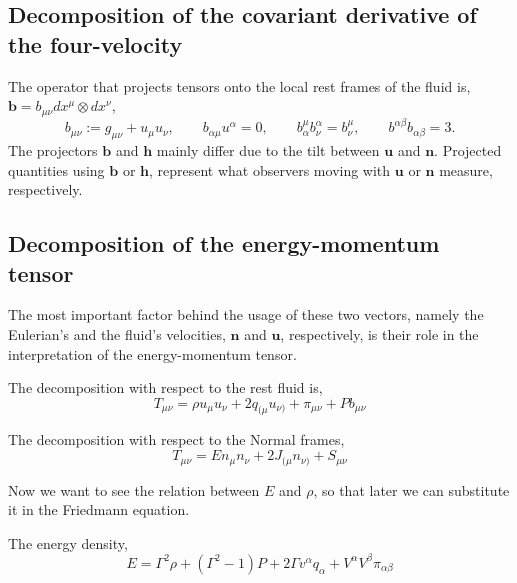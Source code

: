 \subsection{Decomposition of the covariant derivative of the four-velocity}

The operator that projects tensors onto the local rest frames of the fluid is, $\mathbf{b}=b_{\mu\nu}dx^\mu \otimes dx^\nu$,
\begin{equation}
    b_{\mu\nu}:=g_{\mu\nu}+u_\mu u_\nu,\qquad b_{\alpha\mu}u^\alpha=0,\qquad b^\mu_\alpha b^\alpha_\nu = b^\mu_\nu,\qquad b^{\alpha\beta}b_{\alpha\beta}=3.
\end{equation}
The projectors $\mathbf{b}$ and $\mathbf{h}$ mainly differ due to the tilt between $\mathbf{u}$ and $\mathbf{n}$.
Projected quantities using $\mathbf{b}$ or $\mathbf{h}$, represent what observers moving with $\mathbf{u}$ or $\mathbf{n}$ measure, respectively.


\subsection{Decomposition of the energy-momentum tensor}
The most important factor behind the usage of these two vectors, namely the Eulerian's and the fluid's velocities, $\mathbf{n}$ and $\mathbf{u}$, respectively, is their role in the interpretation of the energy-momentum tensor.

The decomposition with respect to the rest fluid is,
\begin{equation}
    T_{\mu\nu}=\rho u_\mu u_\nu + 2q_{(\mu}u_{\nu)} + \pi_{\mu\nu} + P b_{\mu\nu}
    \label{eqn:general_decomposition_energy_tensor_fluid}
\end{equation}

The decomposition with respect to the Normal frames,
\begin{equation}
    T_{\mu\nu} = E n_\mu n_\nu + 2J_{(\mu}n_{\nu)}+ S_{\mu\nu}
    \label{eqn:general_decomposition_energy_tensor_normal}
\end{equation}

Now we want to see the relation between $E$ and $\rho$, so that later we can substitute it in the Friedmann equation.

The energy density,
\begin{equation}
    E=\Gamma^2 \rho + (\Gamma^2-1)P+2\Gamma v^\alpha q_\alpha + V^\alpha V^\beta \pi_{\alpha\beta}
    \label{eqn:general_energy_fluid_normal}
\end{equation}

